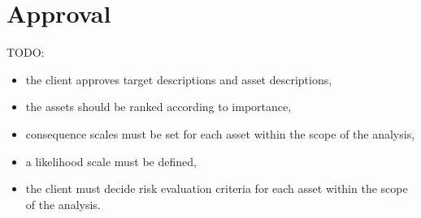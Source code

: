 \section{Approval}

TODO:
\begin{itemize}
    \item the client approves target descriptions and asset
descriptions,
    \item the assets should be ranked according to importance,
    \item consequence scales must be set for each asset within
the scope of the analysis,
    \item a likelihood scale must be defined,
    \item the client must decide risk evaluation criteria for each
asset within the scope of the analysis. 
\end{itemize}
